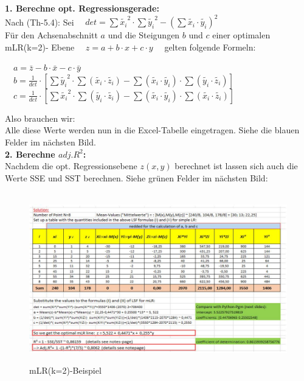 \documentclass[12pt]{article}
\begin{document}
\textbf{1. Berechne opt. Regressionsgerade:}\\[0.2cm]   
Nach (Th-5.4): Sei $ \quad det = \sum{\widetilde{x_i}^2} \cdot \sum{\widetilde{y_i}^2}  -  (\sum{\widetilde{x_i} \cdot \widetilde{y_i}})^2 \quad $ \\
Für den Achsenabschnitt $a$ und die Steigungen $b$ und $c$ einer optimalen mLR(k=2)- Ebene $\quad  z = a +  b \cdot x + c \cdot y \quad $  
gelten folgende Formeln:\\[0.4cm]
\begin{large}
$ \quad a = \bar{z} - b \cdot \bar{x} - c \cdot \bar{y} \ \qquad \qquad \qquad\qquad $ \\[0.3cm]
$ \quad b = \frac{1}{det} \cdot \left[  \sum{\widetilde{y_i}^2} \cdot  \sum{(\widetilde{x_i} \cdot \widetilde{z_i})} - \sum{(\widetilde{x_i} \cdot \widetilde{y_i})} \cdot  \sum{(\widetilde{y_i} \cdot \widetilde{z_i})}          \right] $    \\[0.3cm]                                
$ \quad c = \frac{1}{det} \cdot \left[ \sum{\widetilde{x_i}^2} \cdot  \sum{(\widetilde{y_i} \cdot \widetilde{z_i})} - \sum{(\widetilde{x_i} \cdot \widetilde{y_i})} \cdot  \sum{( \widetilde{x_i} \cdot \widetilde{z_i})}          \right] $ \\[0.5cm]
\end{large}
Also brauchen wir: {}
\\[0.2cm]
Alle diese Werte werden nun in die Excel-Tabelle eingetragen. Siehe die blauen Felder im nächsten Bild.\\[0.1cm]

\textbf{2. Berechne $adj.R^2$:}\\[0.2cm]
Nachdem die opt. Regressionsebene $z(x,y)$ berechnet ist lassen sich auch die  Werte SSE und SST berechnen. Siehe grünen Felder im nächsten Bild:\\
\\[1.5cm]

\begin{figure}[htp]
  \centering
  \hspace*{-0.8cm} 
  \includegraphics[width=1.2\textwidth]{Einfaches-mLR(k=2)_Beispiel}\\
  \caption{mLR(k=2)-Beispiel}
  \label{fig:mLR(k=2)-Beispiel}
\end{figure}
\newpage
\end{document}
